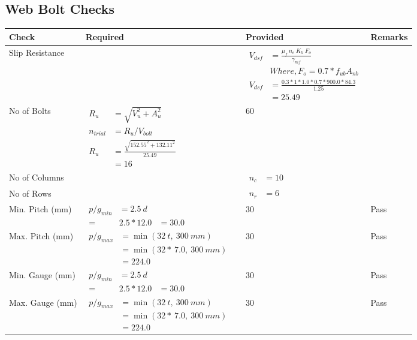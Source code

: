 \documentclass{article}%
\begin{document}
\subsection{Web Bolt Checks}%
\label{subsec:WebBoltChecks}%
\renewcommand{\arraystretch}{1.2}%
\begin{longtable}{|p{4cm}|p{5cm}|p{5.5cm}|p{1.5cm}|}%
\hline%
\rowcolor{OsdagGreen}%
Check&Required&Provided&Remarks\\%
\hline%
\endhead%
\hline%
Slip Resistance&&$\begin{aligned}V_{dsf} & = \frac{\mu_f~ n_e~  K_h~ F_o}{\gamma_{mf}}\\ & Where, F_o = 0.7 * f_{ub} A_{nb}\\ V_{dsf} & = \frac{0.3*1*1.0* 0.7 *900.0*84.3}{1.25}\\ & =25.49\end{aligned}$&\\%
\hline%
No of Bolts&$\begin{aligned}R_{u} &= \sqrt{V_u^2+A_u^2}\\ n_{trial} &= R_u/ V_{bolt}\\ R_{u} &= \frac{\sqrt{152.55^2+132.11^2}}{25.49}\\ &=16\end{aligned}$&60&\\%
\hline%
No of Columns&&$\begin{aligned} n_c &=10\end{aligned}$&\\%
\hline%
No of Rows&&$\begin{aligned} n_r &=6\end{aligned}$&\\%
\hline%
Min. Pitch (mm)&$\begin{aligned}p/g_{min}&= 2.5 ~ d&\\ =&2.5*12.0&=30.0\end{aligned}$&30&Pass\\%
\hline%
Max. Pitch (mm)&$\begin{aligned}p/g_{max} &=\min(32~t,~300~mm)&\\ &=\min(32 *~7.0,~ 300 ~mm)\\&=224.0\end{aligned}$&30&Pass\\%
\hline%
Min. Gauge (mm)&$\begin{aligned}p/g_{min}&= 2.5 ~ d&\\ =&2.5*12.0&=30.0\end{aligned}$&30&Pass\\%
\hline%
Max. Gauge (mm)&$\begin{aligned}p/g_{max} &=\min(32~t,~300~mm)&\\ &=\min(32 *~7.0,~ 300 ~mm)\\&=224.0\end{aligned}$&30&Pass\\%

\end{longtable}
\end{document}

